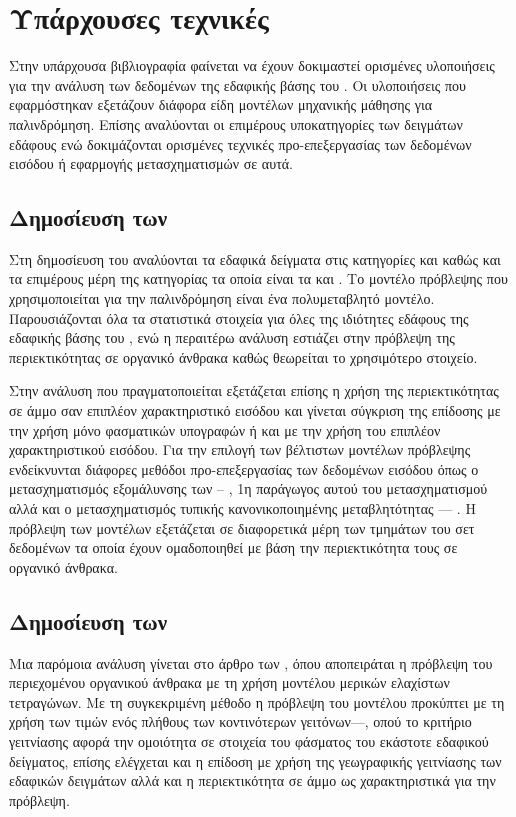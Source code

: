 \section{Υπάρχουσες τεχνικές}
Στην υπάρχουσα βιβλιογραφία φαίνεται να έχουν δοκιμαστεί ορισμένες υλοποιήσεις για την ανάλυση των δεδομένων της εδαφικής βάσης του . Οι υλοποιήσεις που εφαρμόστηκαν εξετάζουν διάφορα είδη μοντέλων μηχανικής μάθησης για παλινδρόμηση. Επίσης αναλύονται οι επιμέρους υποκατηγορίες των δειγμάτων εδάφους ενώ δοκιμάζονται ορισμένες τεχνικές προ-επεξεργασίας των δεδομένων εισόδου ή εφαρμογής μετασχηματισμών σε αυτά.

\subsection{Δημοσίευση των }
Στη δημοσίευση του  \cite{stevens_lucas_soil} αναλύονται τα εδαφικά δείγματα στις κατηγορίες  και  καθώς και τα επιμέρους μέρη της κατηγορίας  τα οποία είναι τα  και . Το μοντέλο πρόβλεψης που χρησιμοποιείται για την παλινδρόμηση είναι ένα πολυμεταβλητό μοντέλο. Παρουσιάζονται όλα τα στατιστικά στοιχεία για όλες της ιδιότητες εδάφους της εδαφικής βάσης του , ενώ η περαιτέρω ανάλυση εστιάζει στην πρόβλεψη της περιεκτικότητας σε οργανικό άνθρακα καθώς θεωρείται το χρησιμότερο στοιχείο.

Στην ανάλυση που πραγματοποιείται εξετάζεται επίσης η χρήση της περιεκτικότητας σε άμμο σαν επιπλέον χαρακτηριστικό εισόδου και γίνεται σύγκριση της επίδοσης με την χρήση μόνο φασματικών υπογραφών ή και με την χρήση του επιπλέον χαρακτηριστικού εισόδου. Για την επιλογή των βέλτιστων μοντέλων πρόβλεψης ενδείκνυνται διάφορες μεθόδοι προ-επεξεργασίας των δεδομένων εισόδου όπως ο μετασχηματισμός εξομάλυνσης των -- \cite{savitzky_golay}, 1η παράγωγος αυτού του μετασχηματισμού αλλά και ο μετασχηματισμός τυπικής κανονικοποιημένης μεταβλητότητας --- . Η πρόβλεψη των μοντέλων εξετάζεται σε διαφορετικά μέρη των τμημάτων του σετ δεδομένων τα οποία έχουν ομαδοποιηθεί με βάση την περιεκτικότητα τους σε οργανικό άνθρακα.

\subsection{Δημοσίευση των }
Μια παρόμοια ανάλυση γίνεται στο άρθρο των  \cite{nocita_lucas_soil}, όπου αποπειράται η πρόβλεψη του περιεχομένου οργανικού άνθρακα με τη χρήση μοντέλου μερικών ελαχίστων τετραγώνων. Με τη συγκεκριμένη μέθοδο η πρόβλεψη του μοντέλου προκύπτει με τη χρήση των τιμών ενός πλήθους των κοντινότερων γειτόνων---, οπού το κριτήριο γειτνίασης αφορά την ομοιότητα σε στοιχεία του φάσματος του εκάστοτε εδαφικού δείγματος, επίσης ελέγχεται και η επίδοση με χρήση της γεωγραφικής γειτνίασης των εδαφικών δειγμάτων αλλά και η περιεκτικότητα σε άμμο ως χαρακτηριστικά για την πρόβλεψη.

